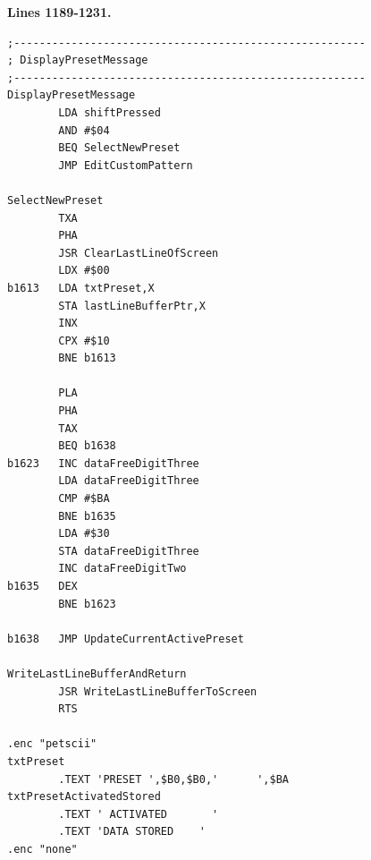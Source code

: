 \clearpage
\textbf{Lines 1189-1231. } 
\begin{lstlisting}
;-------------------------------------------------------
; DisplayPresetMessage
;-------------------------------------------------------
DisplayPresetMessage    
        LDA shiftPressed
        AND #$04
        BEQ SelectNewPreset
        JMP EditCustomPattern

SelectNewPreset
        TXA 
        PHA 
        JSR ClearLastLineOfScreen
        LDX #$00
b1613   LDA txtPreset,X
        STA lastLineBufferPtr,X
        INX 
        CPX #$10
        BNE b1613

        PLA 
        PHA 
        TAX 
        BEQ b1638
b1623   INC dataFreeDigitThree
        LDA dataFreeDigitThree
        CMP #$BA
        BNE b1635
        LDA #$30
        STA dataFreeDigitThree
        INC dataFreeDigitTwo
b1635   DEX 
        BNE b1623

b1638   JMP UpdateCurrentActivePreset

WriteLastLineBufferAndReturn    
        JSR WriteLastLineBufferToScreen
        RTS 

.enc "petscii" 
txtPreset
        .TEXT 'PRESET ',$B0,$B0,'      ',$BA
txtPresetActivatedStored
        .TEXT ' ACTIVATED       '
        .TEXT 'DATA STORED    '
.enc "none" 
\end{lstlisting}
\clearpage

